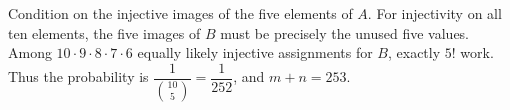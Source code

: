 Condition on the injective images of the five elements of $A$. For injectivity on all ten elements, the five images of $B$ must be precisely the unused five values. Among $10\cdot9\cdot8\cdot7\cdot6$ equally likely injective assignments for $B$, exactly $5!$ work. Thus the probability is $\dfrac{1}{\binom{10}{5}}=\dfrac{1}{252}$, and $m+n=\boxed{253}$.

